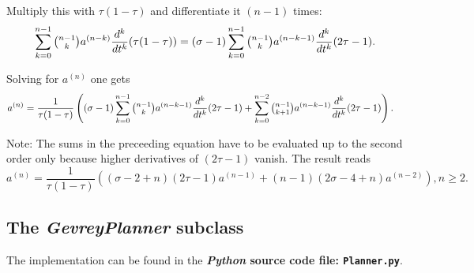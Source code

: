 \documentclass[a4paper,11pt,headings=standardclasses,parskip=half]{scrartcl}
\newcommand{\py}{\emph{Python}\xspace}
\begin{document}
\begin{appendices}
Multiply this with ${\tau(1-\tau)}$ and differentiate it $(n-1)$ times:
\begin{equation*}
\sum_{k=0}^{n-1}\tbinom{n-1}{k} a^{(n-k)}\frac{d^k}{dt^k}(\tau(1-\tau))={(\sigma-1)}\sum_{k=0}^{n-1}\tbinom
{n-1}{k} a^{(n-k-1)}\frac{d^k}{dt^k}(2\tau-1).
\end{equation*}

Solving for $a^{(n)}$ one gets
\small
\begin{align*}%
a^{(n)}&=\frac{1}{\tau(1-\tau)}\left((\sigma-1)\sum_{k=0}^{n-1}\tbinom{n-1}{k} a^{(n-k-1)}\frac{d^k}{dt^k}(2\tau-1)+\sum_{k=0}^{n-2}\tbinom{n-1}{k+1} a^{(n-k-1)}\frac{d^k}{dt^k}(2\tau-1)\right).
\end{align*}
\normalsize

Note: The sums in the preceeding equation have to be evaluated up to the second order only because higher derivatives of $(2\tau-1)$ vanish. The result reads
\begin{equation*}
a^{(n)}=\frac{1}{\tau(1-\tau)}\left((\sigma-2+n)(2\tau-1)a^{(n-1)}+(n-1)(2\sigma-4+n)a^{(n-2)}\right), n\ge 2.
\end{equation*}
\subsection{The \emph{GevreyPlanner} subclass}
The implementation can be found in the \textbf{\py source code file: \texttt{Planner.py}}.
\end{appendices}
\printglossaries
\end{document}
